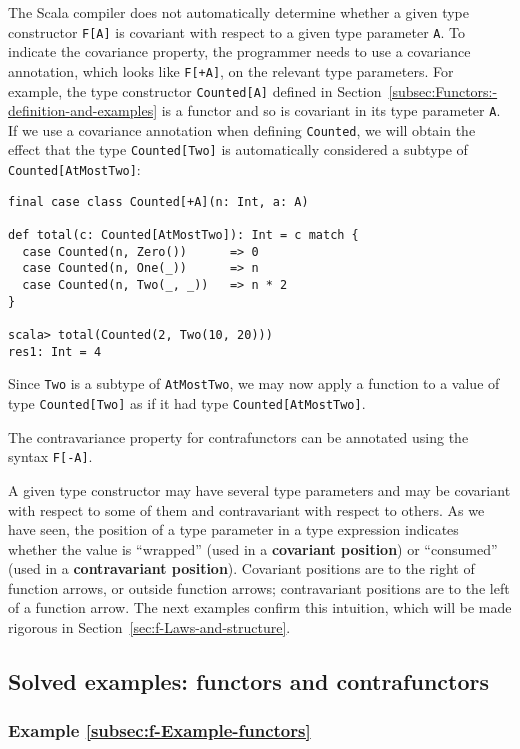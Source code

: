 The Scala compiler does not automatically determine whether a given
type constructor \lstinline!F[A]! is covariant with respect to a
given type parameter \lstinline!A!. To indicate the covariance property,
the programmer needs to use a covariance annotation, which looks like
\lstinline!F[+A]!, on the relevant type parameters. For example,
the type constructor \lstinline!Counted[A]! defined in Section~\ref{subsec:Functors:-definition-and-examples}
is a functor and so is covariant in its type parameter \lstinline!A!.
If we use a covariance annotation when defining \lstinline!Counted!,
we will obtain the effect that the type \lstinline!Counted[Two]!
is automatically considered a subtype of \lstinline!Counted[AtMostTwo]!:
\begin{lstlisting}
final case class Counted[+A](n: Int, a: A)

def total(c: Counted[AtMostTwo]): Int = c match {
  case Counted(n, Zero())      => 0
  case Counted(n, One(_))      => n
  case Counted(n, Two(_, _))   => n * 2
}

scala> total(Counted(2, Two(10, 20)))
res1: Int = 4
\end{lstlisting}
Since \lstinline!Two! is a subtype of \lstinline!AtMostTwo!, we
may now apply a function to a value of type \lstinline!Counted[Two]!
as if it had type \lstinline!Counted[AtMostTwo]!.

The contravariance property for contrafunctors can be annotated using
the syntax \lstinline!F[-A]!.

A given type constructor may have several type parameters and may
be covariant with respect to some of them and contravariant with respect
to others. As we have seen, the position of a type parameter in a
type expression indicates whether the value is ``wrapped'' (used
in a \textbf{covariant position}) or ``consumed''
(used in a \textbf{contravariant position}).
Covariant positions are to the right of function arrows, or outside
function arrows; contravariant positions are to the left of a function
arrow. The next examples confirm this intuition, which will be made
rigorous in Section~\ref{sec:f-Laws-and-structure}.

\subsection{Solved examples: functors and contrafunctors}

\subsubsection{Example \label{subsec:f-Example-functors}\ref{subsec:f-Example-functors}}

